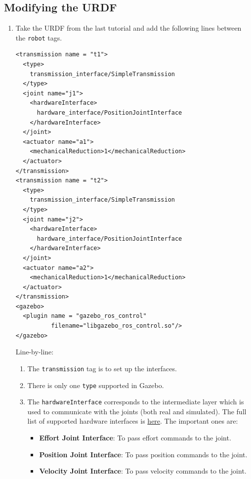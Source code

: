 \documentclass{article}
\begin{document}
        \subsection{Modifying the URDF}
            \begin{enumerate}
                \item Take the URDF from the last tutorial and add the following lines between the 
                \texttt{robot} tags. \newpage
                \begin{verbatim}
<transmission name = "t1">
  <type>
    transmission_interface/SimpleTransmission
  </type>
  <joint name="j1">
    <hardwareInterface>
      hardware_interface/PositionJointInterface
    </hardwareInterface>
  </joint>
  <actuator name="a1">
    <mechanicalReduction>1</mechanicalReduction>
  </actuator>
</transmission>
<transmission name = "t2">
  <type>
    transmission_interface/SimpleTransmission
  </type>
  <joint name="j2">
    <hardwareInterface>
      hardware_interface/PositionJointInterface
    </hardwareInterface>
  </joint>
  <actuator name="a2">
    <mechanicalReduction>1</mechanicalReduction>
  </actuator>
</transmission>
<gazebo>
  <plugin name = "gazebo_ros_control" 
          filename="libgazebo_ros_control.so"/>
</gazebo>                    
                \end{verbatim}
                Line-by-line:
                \begin{enumerate}
                    \item The \texttt{transmission} tag is to set up the interfaces.
                    \item There is only one \texttt{type} supported in Gazebo.
                    \item The \texttt{hardwareInterface} corresponds to the intermediate layer which 
                    is used to communicate with the joints (both real and simulated). The full 
                    list of supported hardware interfaces is \href{http://wiki.ros.org/ros_control#Hardware_Interfaces}{here}.
                    The important ones are:
                    \begin{itemize}
                        \item \textbf{Effort Joint Interface}: To pass effort commands to the joint.
                        \item \textbf{Position Joint Interface}: To pass position commands to the joint.
                        \item \textbf{Velocity Joint Interface}: To pass velocity commands to the joint.

\end{itemize}
\end{enumerate}
\end{enumerate}
\end{document}
